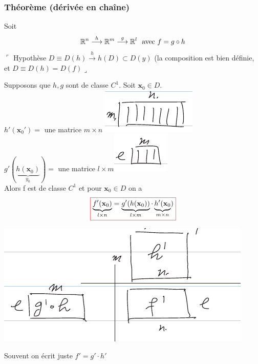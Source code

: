 \documentclass[12pt,a4paper]{article}
\begin{document}
\subsubsection{Théorème (dérivée en chaîne)}
\begin{boite}
		 Soit 
		\begin{equation*}
			\mathbb{R}^n \overset{h}{\longrightarrow} \mathbb{R}^m \overset{g}{\longrightarrow} \mathbb{R}^l\ \text{ avec } f = g\circ h
		\end{equation*}
		$\ulcorner$ Hypothèse $D \equiv D(h) \overset{h}{\longrightarrow} h(D) \subset D(y)$ (la composition est bien définie, et $D \equiv D(h) = D(f) \lrcorner$

	Supposons que $h,g$ sont de classe $C^1$. Soit $\textbf{x}_0 \in D$.\\
	$h'(\textbf{x}_0') = $ une matrice $m\times n$ \includegraphics[scale=0.3]{images/mn}\\
	$g'(\underbrace{h(\textbf{x}_0)}_{y_0}) = $ une matrice $l\times m$\includegraphics[scale=0.4]{images/lm}\\
	Alors f est de classe $C^1$ et pour $\textbf{x}_0 \in D$ on a 
	\begin{equation*}
		\fcolorbox{red}{white}{$\underbrace{f'(\textbf{x}_0)}_{l\times n} = \underbrace{g'(h(\textbf{x}_0))}_{l\times m} \cdot \underbrace{h'(\textbf{x}_0}_{m\times n})$}
	\end{equation*}
	\begin{center}
		\includegraphics[scale=0.5]{images/multimat}
	\end{center}
\end{boite}
\begin{boite}[0.7]
	 Souvent on écrit juste $f' = g' \cdot h'$
\end{boite}
\end{document}
